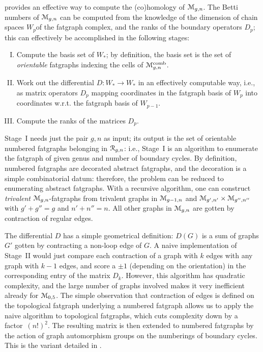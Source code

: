  provides an effective way to compute the
(co)homology of $\mathcal{M}_{g,n}$.  The Betti numbers of $\mathcal{M}_{g,n}$ can be
computed from the knowledge of the dimension of chain spaces $W_p$of
the fatgraph complex, and the ranks of the boundary operators $D_p$;
this can effectively be accomplished in the following stages:
\begin{enumerate}[I.]
\item Compute the basis set of $W_*$; by definition, the basis set is
  the set of \emph{orientable} fatgraphs indexing
  the cells of $\mathcal{M}\sp{\text{comb}}_{g,n}$.
\item Work out the differential $D: W_* \to W_*$ in an
  effectively computable way, i.e., as matrix operators $D_p$ mapping
  coordinates in the fatgraph basis of $W_p$ into coordinates
  w.r.t. the fatgraph basis of $W_{p-1}$.
\item Compute the ranks of the matrices $D_p$.
\end{enumerate}

Stage~I needs just the pair $g,n$ as input; its output is the set of
orientable numbered fatgraphs belonging in $\mathcal{R}_{g,n}$: i.e., Stage~I
is an algorithm to enumerate the fatgraph of given genus and number of
boundary cycles. By definition, numbered fatgraphs are decorated
abstract fatgraphs, and the decoration is a simple combinatorial
datum: therefore, the problem can be reduced to enumerating abstract
fatgraphs.  With a recursive algorithm, one can construct
\emph{trivalent} $\mathcal{M}_{g,n}$-fatgraphs from trivalent graphs in
$\mathcal{M}_{g-1,n}$ and $\mathcal{M}_{g',n'} \times \mathcal{M}_{g'',n''}$ with $g'+g''=g$ and
$n'+n''=n$.  All other graphs in $\mathcal{M}_{g,n}$ are gotten by contraction
of regular edges.

The differential $D$ has a simple geometrical definition: $D(G)$ is a
sum of graphs $G'$ gotten by contracting a non-loop edge of $G$. A
naive implementation of Stage~II would just compare each contraction
of a graph with $k$ edges with any graph with $k-1$ edges, and score a
$\pm 1$ (depending on the orientation) in the corresponding entry of
the matrix $D_k$.  However, this algorithm has quadratic complexity,
and the large number of graphs involved makes it very inefficient
already for $\mathcal{M}_{0,5}$.  The simple observation that contraction of
edges is defined on the topological fatgraph underlying a numbered
fatgraph allows us to apply the naive algorithm to topological
fatgraphs, which cuts complexity down by a factor~$(n!)^2$.  The
resulting matrix is then extended to numbered fatgraphs by the action
of graph automorphism groups on the numberings of boundary cycles.
This is the variant detailed in .

